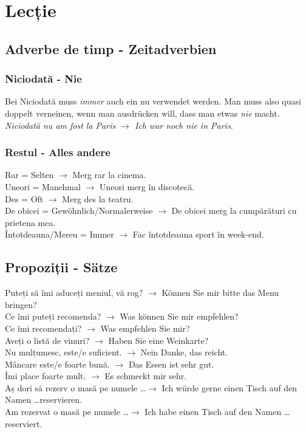 \documentclass[11pt, oneside]{article}
\begin{document}
\pagebreak
\section{Lecție}
\subsection{Adverbe de timp - Zeitadverbien}
\subsubsection*{Niciodată - Nie}
Bei Niciodată muss \emph{immer} auch ein nu verwendet werden. Man muss also quasi 
doppelt verneinen, wenn man ausdrücken will, dass man etwas \emph{nie} macht.\\
\emph{Niciodată nu am fost la Paris $\rightarrow$ Ich war noch nie in Paris.}\\
%
\subsubsection*{Restul - Alles andere}
Rar = Selten $\rightarrow$ Merg rar la cinema.\\
Uneori = Manchmal $\rightarrow$ Uneori merg în discotecă.\\
Des = Oft $\rightarrow$ Merg des la teatru.\\
De obicei = Gewöhnlich/Normalerweise $\rightarrow$ De obicei merg la cumpărături cu prietena mea.\\
Întotdeauna/Mereu = Immer $\rightarrow$ Fac întotdeauna sport în week-end.
\subsection{Propoziții - Sätze}
Puteți să îmi aduceți meniul, vă rog? $\rightarrow$ Können Sie mir bitte das Menu bringen?\\
Ce îmi puteți recomenda? $\rightarrow$ Was können Sie mir empfehlen?\\
Ce îmi recomendați? $\rightarrow$ Was empfehlen Sie mir?\\
Aveți o listă de vinuri? $\rightarrow$ Haben Sie eine Weinkarte?\\
Nu mulțumesc, este/e suficient. $\rightarrow$ Nein Danke, das reicht.\\
Mâncare este/e foarte bună. $\rightarrow$ Das Essen ist sehr gut.\\
Îmi place foarte mult. $\rightarrow$ Es schmeckt mir sehr.\\
Aș dori să rezerv o masă pe numele \dots $\rightarrow$ Ich würde gerne einen Tisch auf den Namen \dots reservieren.\\
Am rezervat o masă pe numele \dots $\rightarrow$ Ich habe einen Tisch auf den Namen \dots reserviert.
\pagebreak
\end{document}
